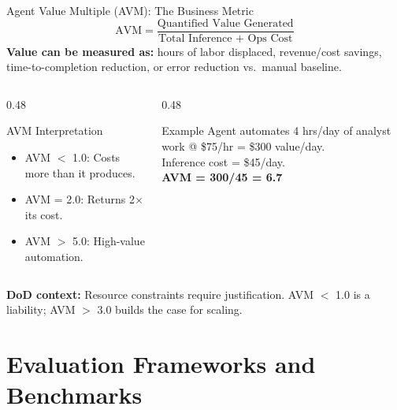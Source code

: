 \documentclass{beamer}       %
\begin{document}
\begin{frame}{Agent Value Multiple (AVM): The Business Metric}
    \small
    \[
        \text{AVM} = \frac{\text{Quantified Value Generated}}{\text{Total Inference + Ops Cost}}
    \]
    \vspace{0.2cm}
    \textbf{Value can be measured as:} hours of labor displaced, revenue/cost savings, time-to-completion reduction, or error reduction vs.\ manual baseline.
    \vspace{0.2cm}
    \begin{columns}[T]
        \begin{column}{0.48\textwidth}
            \begin{block}{AVM Interpretation}
                \begin{itemize}
                    \item AVM $<$ 1.0: Costs more than it produces.
                    \item AVM = 2.0: Returns 2$\times$ its cost.
                    \item AVM $>$ 5.0: High-value automation.
                \end{itemize}
            \end{block}
        \end{column}
        \begin{column}{0.48\textwidth}
            \begin{alertblock}{Example}
                \footnotesize
                Agent automates 4 hrs/day of analyst work @ \$75/hr = \$300 value/day.\\
                Inference cost = \$45/day.\\
                \textbf{AVM = 300/45 = 6.7}
            \end{alertblock}
        \end{column}
    \end{columns}
    \vfill
    \footnotesize\textbf{DoD context:} Resource constraints require justification. AVM $<$ 1.0 is a liability; AVM $>$ 3.0 builds the case for scaling.
\end{frame}

\section{Evaluation Frameworks and Benchmarks}
\end{document}
